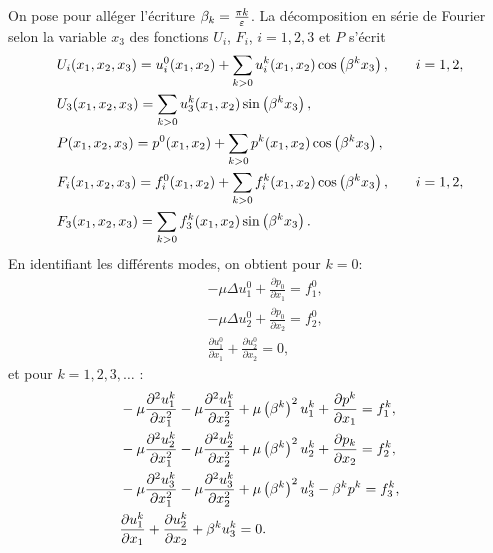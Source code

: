 On pose pour alléger l'écriture $\beta_k = \frac{\pi
k}{\varepsilon}$. La décomposition en série de Fourier selon la
variable $x_3$ des fonctions $U_i$, $F_i$, $i = 1,2,3$ et $P$ s'écrit
\begin{align}
  &U_i(x_1, x_2, x_3) = u_i^0(x_1, x_2) %
                       + \sum_{k > 0} u_i^k(x_1, x_2)%
                       \cos\parent{\beta^kx_3}, &\quad i = 1, 2,\label{eq:fourier-coeff-def-1}\\
  &U_3(x_1, x_2, x_3) = \sum_{k > 0} u_3^k(x_1, x_2)%
                        \sin\parent{\beta^kx_3},\label{eq:fourier-coeff-def-2}\\
  &P(x_1, x_2, x_3) = p^0(x_1, x_2) %
                      + \sum_{k>0}p^k(x_1, x_2)%
                      \cos\parent{\beta^kx_3},\label{eq:fourier-coeff-def-3}\\
  &F_i(x_1, x_2, x_3) = f_i^0(x_1, x_2) %
                        + \sum_{k > 0}f_i^k(x_1, x_2)%
                        \cos\parent{\beta^kx_3}, &\quad i = 1,2,\label{eq:fourier-coeff-def-4}\\
  &F_3(x_1, x_2, x_3) = \sum_{k > 0}f_3^k(x_1,x_2)%
                        \sin\parent{\beta^kx_3}.\label{eq:fourier-coeff-def-5}
\end{align}
En identifiant les différents modes, on obtient pour $k = 0$:
\begin{align}
  &-\mu \Delta u_1^0 + \frac{\partial p_0}{\partial x_1} %
  = f_1^0,\label{eq:fourier-fund-1}\\
  &-\mu \Delta u_2^0 + \frac{\partial p_0}{\partial x_2} %
  = f_2^0,\label{eq:fourier-fund-2}\\
  &\frac{\partial u_1^0}{\partial x_1} +   \frac{\partial u_2^0}{\partial x_2} %
  = 0,\label{eq:fourier-fund-3}
\end{align}
et pour $k = 1, 2, 3,\dots$ :
\begin{align}
  &- \mu\frac{\partial^2 u_1^k}{\partial x_1^2} - \mu\frac{\partial^2 u_1^k}{\partial x_2^2}%
  + \mu\parent{\beta^k}^2 u_1^k%
  + \frac{\partial p^k}{\partial x_1} %
  = f_1^k, \label{eq:fourier-harm-1}\\
  &- \mu\frac{\partial^2 u_2^k}{\partial x_1^2} - \mu\frac{\partial^2 u_2^k}{\partial x_2^2} %
  + \mu\parent{\beta^k}^2 u_2^k %
  + \frac{\partial p_k}{\partial x_2} %
  = f_2^k, \label{eq:fourier-harm-2} \\
  &- \mu\frac{\partial^2 u_3^k}{\partial x_1^2} - \mu\frac{\partial^2 u_3^k}{\partial x_2^2} %
  + \mu\parent{\beta^k}^2 u_3^k %
  - \beta^kp^k %
  = f_3^k, \label{eq:fourier-harm-3}\\
  &  \frac{\partial u_1^k}{\partial x_1} %
  + \frac{\partial u_2^k}{\partial x_2} %
  + \beta^k u_3^k %
  = 0. \label{eq:fourier-incompressibility}
\end{align}
